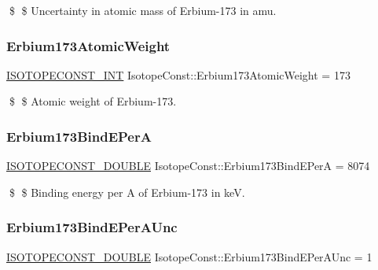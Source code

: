 \$ \$ Uncertainty in atomic mass of Erbium-\/173 in amu. \mbox{\label{group___isotope_const-_erbium-_er173_gac55bf79b1bbc133c54a26eecde6a3306}} 
\subsubsection{\texorpdfstring{Erbium173\+Atomic\+Weight}{Erbium173AtomicWeight}}
{\footnotesize\ttfamily \mbox{\hyperlink{group___isotope_const-_macros_ga5f18360b3e99483a35c32d789e62621c}{I\+S\+O\+T\+O\+P\+E\+C\+O\+N\+S\+T\+\_\+\+I\+NT}} Isotope\+Const\+::\+Erbium173\+Atomic\+Weight = 173}

\$ \$ Atomic weight of Erbium-\/173. \mbox{\label{group___isotope_const-_erbium-_er173_ga5073fd5ea2a005ed2a6299703204e48e}} 
\subsubsection{\texorpdfstring{Erbium173\+Bind\+E\+PerA}{Erbium173BindEPerA}}
{\footnotesize\ttfamily \mbox{\hyperlink{group___isotope_const-_macros_ga8f45a7272ce02c0b4c65c44636ed719a}{I\+S\+O\+T\+O\+P\+E\+C\+O\+N\+S\+T\+\_\+\+D\+O\+U\+B\+LE}} Isotope\+Const\+::\+Erbium173\+Bind\+E\+PerA = 8074}

\$ \$ Binding energy per A of Erbium-\/173 in keV. \mbox{\label{group___isotope_const-_erbium-_er173_gaff1f3dfe7ad194ac363fa20f62a2313e}} 
\subsubsection{\texorpdfstring{Erbium173\+Bind\+E\+Per\+A\+Unc}{Erbium173BindEPerAUnc}}
{\footnotesize\ttfamily \mbox{\hyperlink{group___isotope_const-_macros_ga8f45a7272ce02c0b4c65c44636ed719a}{I\+S\+O\+T\+O\+P\+E\+C\+O\+N\+S\+T\+\_\+\+D\+O\+U\+B\+LE}} Isotope\+Const\+::\+Erbium173\+Bind\+E\+Per\+A\+Unc = 1}

